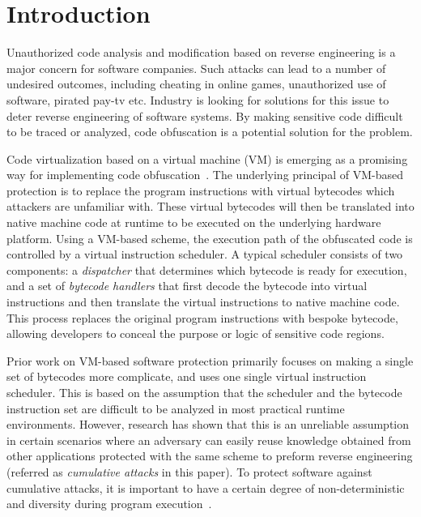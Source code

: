 \section{Introduction}
Unauthorized code analysis and modification based on reverse engineering is a major concern for software companies.
Such attacks can lead to a number of undesired outcomes,
including cheating in online games, unauthorized use of software, pirated pay-tv etc.
Industry is looking for solutions for this issue to deter reverse engineering of software systems.
By making sensitive code difficult to be traced or analyzed, code obfuscation is a potential solution for the problem.

Code virtualization based on a virtual machine (VM) is emerging as a
promising way for implementing code
obfuscation~\cite{1Themida,2CV,3Vmprotect,5fang2011multi,6ming2011software,7wang2014tdvmp,8wang2013nislvmp}.
The underlying principal of VM-based protection is to replace the program
instructions with virtual bytecodes which attackers are unfamiliar with.
These virtual bytecodes will then be translated into native machine code at
runtime to be executed on the underlying hardware platform. Using a VM-based
scheme, the execution path of the obfuscated code is controlled by a virtual
instruction scheduler. A typical scheduler consists of two components: a
\emph{dispatcher} that determines which bytecode is ready for execution, and
a set of \emph{bytecode handlers} that first decode the bytecode into virtual
instructions and then translate the virtual instructions to native
machine code. This process replaces the original program instructions with
bespoke bytecode, allowing developers to conceal the purpose or logic of
sensitive code regions.

Prior work on VM-based software protection primarily focuses on making a
single set of bytecodes more complicate, and uses one single virtual
instruction scheduler. This is based on the assumption that the scheduler and
the bytecode instruction set are difficult to be analyzed in most practical
runtime environments. However, research has shown that this is an unreliable
assumption~\cite{10falliere2009inside} in certain scenarios where an
adversary can easily reuse knowledge obtained from other applications
protected with the same scheme to preform reverse engineering (referred as
\emph{cumulative attacks} in this paper). To protect software against
cumulative attacks, it is important to have a certain degree of non-deterministic
and diversity during program execution~\cite{4collberg}.

